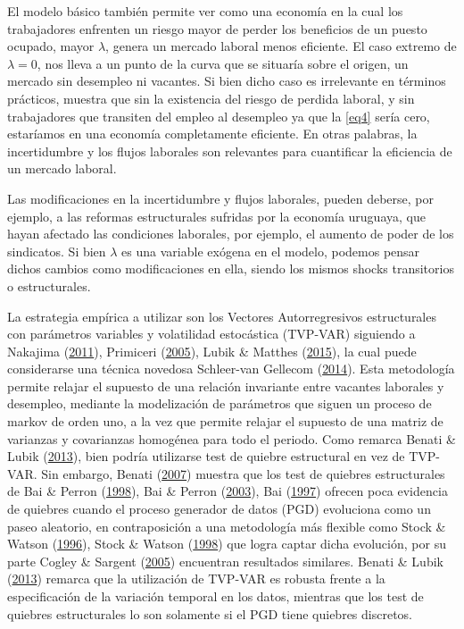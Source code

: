\documentclass[12pt,twoside]{reedthesis}
\begin{document}
El modelo básico también permite ver como una economía en la cual los trabajadores enfrenten un riesgo mayor de perder los beneficios de un puesto ocupado, mayor \(\lambda\), genera un mercado laboral menos eficiente. El caso extremo de \(\lambda=0\), nos lleva a un punto de la curva que se situaría sobre el origen, un mercado sin desempleo ni vacantes. Si bien dicho caso es irrelevante en términos prácticos, muestra que sin la existencia del riesgo de perdida laboral, y sin trabajadores que transiten del empleo al desempleo ya que la \eqref{eq4} sería cero, estaríamos en una economía completamente eficiente. En otras palabras, la incertidumbre y los flujos laborales son relevantes para cuantificar la eficiencia de un mercado laboral.

Las modificaciones en la incertidumbre y flujos laborales, pueden deberse, por ejemplo, a las reformas estructurales sufridas por la economía uruguaya, que hayan afectado las condiciones laborales, por ejemplo, el aumento de poder de los sindicatos. Si bien \(\lambda\) es una variable exógena en el modelo, podemos pensar dichos cambios como modificaciones en ella, siendo los mismos shocks transitorios o estructurales.

La estrategia empírica a utilizar son los Vectores Autorregresivos estructurales con parámetros variables y volatilidad estocástica (TVP-VAR) siguiendo a Nakajima (\protect\hyperlink{ref-Nakajima2011}{2011}), Primiceri (\protect\hyperlink{ref-Primiceri2005}{2005}), Lubik \& Matthes (\protect\hyperlink{ref-Lubik2016b}{2015}), la cual puede considerarse una técnica novedosa Schleer-van Gellecom (\protect\hyperlink{ref-Craven2014}{2014}). Esta metodología permite relajar el supuesto de una relación invariante entre vacantes laborales y desempleo, mediante la modelización de parámetros que siguen un proceso de markov de orden uno, a la vez que permite relajar el supuesto de una matriz de varianzas y covarianzas homogénea para todo el periodo. Como remarca Benati \& Lubik (\protect\hyperlink{ref-Benati2013}{2013}), bien podría utilizarse test de quiebre estructural en vez de TVP-VAR. Sin embargo, Benati (\protect\hyperlink{ref-Benati2007}{2007}) muestra que los test de quiebres estructurales de Bai \& Perron (\protect\hyperlink{ref-BaiPerron1998}{1998}), Bai \& Perron (\protect\hyperlink{ref-BaiPerron2003}{2003}), Bai (\protect\hyperlink{ref-Bai1997}{1997}) ofrecen poca evidencia de quiebres cuando el proceso generador de datos (PGD) evoluciona como un paseo aleatorio, en contraposición a una metodología más flexible como Stock \& Watson (\protect\hyperlink{ref-Stock1996}{1996}), Stock \& Watson (\protect\hyperlink{ref-Stock1998}{1998}) que logra captar dicha evolución, por su parte Cogley \& Sargent (\protect\hyperlink{ref-Cogley2005}{2005}) encuentran resultados similares. Benati \& Lubik (\protect\hyperlink{ref-Benati2013}{2013}) remarca que la utilización de TVP-VAR es robusta frente a la especificación de la variación temporal en los datos, mientras que los test de quiebres estructurales lo son solamente si el PGD tiene quiebres discretos.
\end{document}
